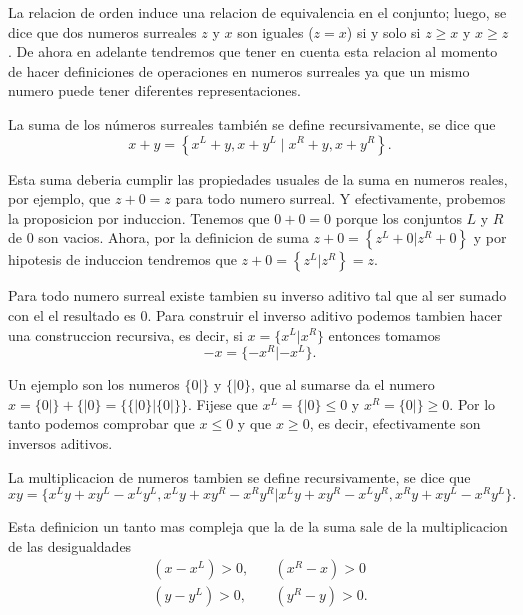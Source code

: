     La relacion de orden induce una relacion de equivalencia en el conjunto; luego, se dice que dos numeros surreales $z$ y $x$ son iguales ($z=x$) si y solo si $z\ge x$ y $x\ge z$. De ahora en adelante tendremos que tener en cuenta esta relacion al momento de hacer definiciones de operaciones en numeros surreales ya que un mismo numero puede tener diferentes representaciones.

    La suma de los números surreales también se define recursivamente, se dice que
    \[
        x + y  = \left\{x^L+y, x+y^L\;|\;x^R+y, x+y^R\right\}.
    \]

    Esta suma deberia cumplir las propiedades usuales de la suma en numeros reales, por ejemplo, que $z+0=z$ para todo numero surreal. Y efectivamente, probemos la proposicion por induccion. Tenemos que $0+0 = 0$ porque los conjuntos $L$ y $R$ de $0$ son vacios. Ahora, por la definicion de suma $z+0 = \left\{z^L+0|z^R+0\right\}$ y por hipotesis de induccion tendremos que $z+0 = \left\{z^L|z^R\right\} = z$.

    Para todo numero surreal existe tambien su inverso aditivo tal que al ser sumado con el el resultado es $0$. Para construir el inverso aditivo podemos tambien hacer una construccion recursiva, es decir, si $x=\{x^L|x^R\}$ entonces tomamos 
    \[
        -x = \{-x^R|-x^L\}.
    \]

    Un ejemplo son los numeros $\{0|\}$ y $\{|0\}$, que al sumarse da el numero $x = \{0|\} + \{|0\} = \{\{|0\}|\{0|\}\}$. Fijese que $x^L = \{|0\}\le 0$ y $x^R = \{0|\}\ge 0$. Por lo tanto podemos comprobar que $x\le 0$ y que $x \ge 0$, es decir, efectivamente son inversos aditivos.

    La multiplicacion de numeros tambien se define recursivamente, se dice que
    \[
        xy = \{x^Ly+xy^L-x^Ly^L, x^Ly+xy^R-x^Ry^R| x^Ly+xy^R-x^Ly^R, x^Ry+xy^L-x^Ry^L\}.
    \]

    Esta definicion un tanto mas compleja que la de la suma sale de la multiplicacion de las desigualdades
    \begin{align*}
        (x-x^L) > 0, \quad & (x^R-x)>0 \\
        (y-y^L) > 0, \quad & (y^R-y)>0.
    \end{align*}
    